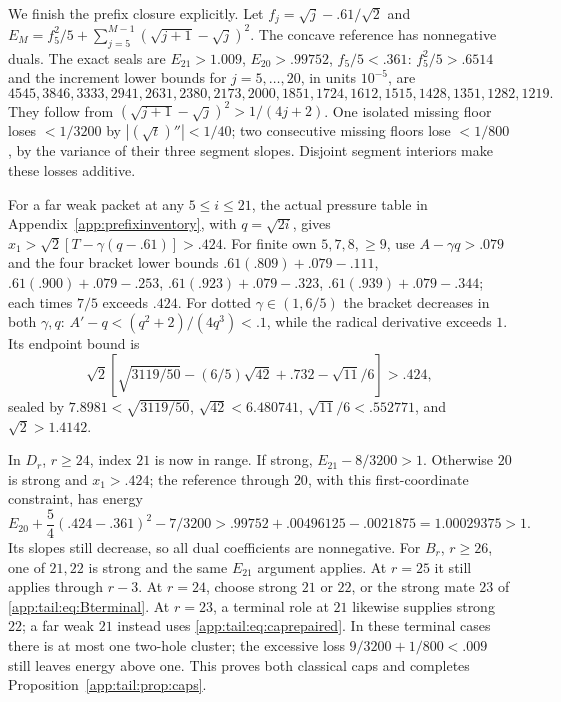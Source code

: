 We finish the prefix closure explicitly. Let
$f_j=\sqrt j-.61/\sqrt2$ and
$E_M=f_5^2/5+\sum_{j=5}^{M-1}(\sqrt{j+1}-\sqrt j)^2$.
The concave reference has nonnegative duals. The exact seals are
$E_{21}>1.009$, $E_{20}>.99752$, $f_5/5<.361$:
$f_5^2/5>.6514$ and the increment lower bounds for $j=5,\ldots,20$,
in units $10^{-5}$, are
\[
4545,3846,3333,2941,2631,2380,2173,2000,
1851,1724,1612,1515,1428,1351,1282,1219.
\]
They follow from $(\sqrt{j+1}-\sqrt j)^2>1/(4j+2)$.
One isolated missing floor loses $<1/3200$ by
$|(\sqrt t)''|<1/40$; two consecutive missing floors lose
$<1/800$, by the variance of their three segment slopes.
Disjoint segment interiors make these losses additive.

For a far weak packet at any $5\le i\le21$, the actual pressure
table in Appendix~\ref{app:prefixinventory}, with $q=\sqrt{2i}$, gives
$x_1>\sqrt2[T-\gamma(q-.61)]>.424$.
For finite own $5,7,8,\ge9$, use $A-\gamma q>.079$ and the
four bracket lower bounds
$ .61(.809)+.079-.111$,
$ .61(.900)+.079-.253$,
$ .61(.923)+.079-.323$,
$ .61(.939)+.079-.344$; each times $7/5$ exceeds $.424$.
For dotted $\gamma\in(1,6/5)$ the bracket decreases in both
$\gamma,q$: $A'-q<(q^2+2)/(4q^3)<.1$, while the radical
derivative exceeds $1$. Its endpoint bound is
\[
 \sqrt2[\sqrt{3119/50}-(6/5)\sqrt{42}+.732-\sqrt{11}/6]>.424,
\]
sealed by $7.8981<\sqrt{3119/50}$, $\sqrt{42}<6.480741$,
$\sqrt{11}/6<.552771$, and $\sqrt2>1.4142$.

In $D_r$, $r\ge24$, index $21$ is now in range. If strong,
$E_{21}-8/3200>1$. Otherwise $20$ is strong and $x_1>.424$;
the reference through $20$, with this first-coordinate constraint,
has energy
\begin{equation}\label{app:tail:eq:caprepaired}
 E_{20}+\frac54(.424-.361)^2-7/3200
 >.99752+.00496125-.0021875=1.00029375>1.
\end{equation}
Its slopes still decrease, so all dual coefficients are nonnegative.
For $B_r$, $r\ge26$, one of $21,22$ is strong and the same
$E_{21}$ argument applies. At $r=25$ it still applies through
$r-3$. At $r=24$, choose strong $21$ or $22$, or the strong mate
$23$ of \eqref{app:tail:eq:Bterminal}. At $r=23$, a terminal role at $21$
likewise supplies strong $22$; a far weak $21$ instead uses
\eqref{app:tail:eq:caprepaired}. In these terminal cases there is at most
one two-hole cluster; the excessive loss $9/3200+1/800<.009$
still leaves energy above one. This proves both classical caps and
completes Proposition~\ref{app:tail:prop:caps}.

